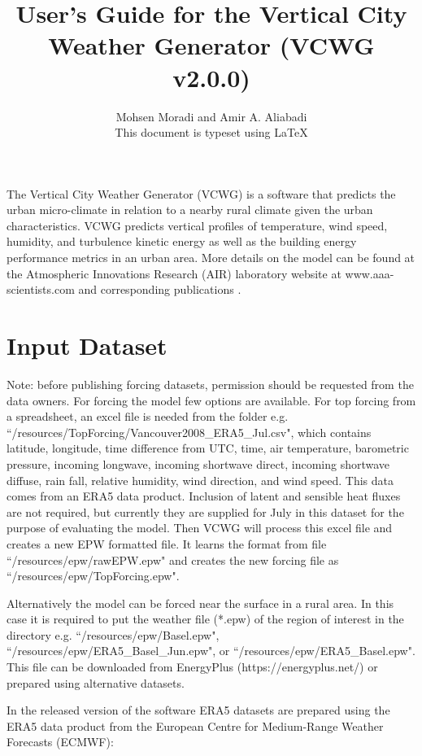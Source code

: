 \documentclass[12pt]{article}
\title{User's Guide for the Vertical City Weather Generator
	(VCWG v2.0.0)}
\author{Mohsen Moradi and Amir A. Aliabadi\\
  \small This document is typeset using \LaTeX \\
}
\begin{document}
\maketitle

The Vertical City Weather Generator (VCWG) is a software that predicts the urban micro-climate in relation to a nearby rural climate given the urban characteristics. VCWG predicts vertical profiles of temperature, wind speed, humidity, and turbulence kinetic energy as well as the building energy performance metrics in an urban area. More details on the model can be found at the Atmospheric Innovations Research (AIR) laboratory website at www.aaa-scientists.com and corresponding publications \cite{Moradi2021a, Moradi2021b, Aliabadi2021b, Moradi2022}.

\section{Input Dataset}

Note: before publishing forcing datasets, permission should be requested from the data owners. For forcing the model few options are available. For top forcing from a spreadsheet, an excel file is needed from the folder e.g. ``/resources/TopForcing/Vancouver2008\_ERA5\_Jul.csv", which contains latitude, longitude, time difference from UTC, time, air temperature, barometric pressure, incoming longwave, incoming shortwave direct, incoming shortwave diffuse, rain fall, relative humidity, wind direction, and wind speed. This data comes from an ERA5 data product. Inclusion of latent and sensible heat fluxes are not required, but currently they are supplied for July in this dataset for the purpose of evaluating the model. Then VCWG will process this excel file and creates a new EPW formatted file. It learns the format from file ``/resources/epw/rawEPW.epw" and creates the new forcing file as ``/resources/epw/TopForcing.epw".

Alternatively the model can be forced near the surface in a rural area. In this case it is required to put the weather file (*.epw) of the region of interest in the directory e.g. ``/resources/epw/Basel.epw", ``/resources/epw/ERA5\_Basel\_Jun.epw", or ``/resources/epw/ERA5\_Basel.epw". This file can be downloaded from EnergyPlus (https://energyplus.net/) or prepared using alternative datasets. 

In the released version of the software ERA5 datasets are prepared using the ERA5 data product from the European Centre for Medium-Range Weather Forecasts (ECMWF):
\end{document}
